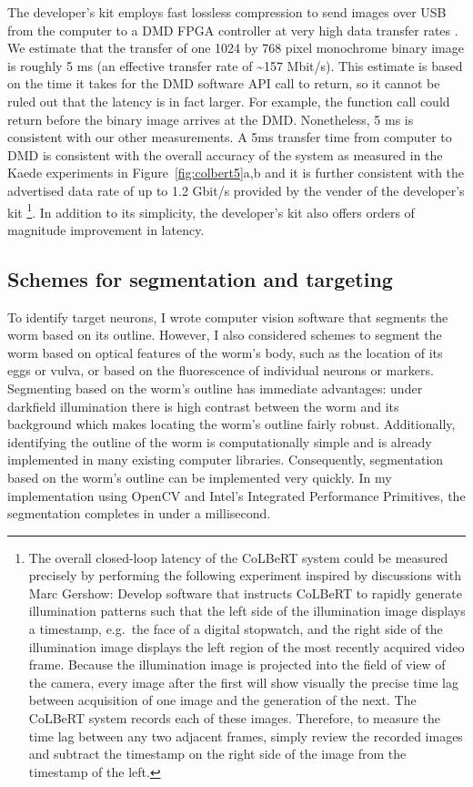 The developer's kit employs fast lossless compression to send images over USB from the computer to a DMD FPGA controller at very high data transfer rates 
\citep{vialux_vialux_2009}. We estimate that the transfer of one 1024 by 768 pixel monochrome binary image is roughly 5 ms (an effective transfer rate of \textasciitilde157 Mbit/s). This estimate is based on the time it takes for the DMD software API call to return, so it cannot be ruled out that the latency is in fact larger. For example, the function call could return before the binary image arrives at the DMD. Nonetheless, 5 ms is consistent with our other measurements. A 5ms transfer time from computer to DMD is consistent with the overall accuracy of the system as measured in the Kaede experiments in Figure~\ref{fig:colbert5}a,b and it is further consistent with the advertised data rate of up to 1.2 Gbit/s provided by the vender of the developer's kit \citep{vialux_vialux_2009}\footnote{The overall closed-loop latency of the CoLBeRT system could be measured precisely by performing the following experiment inspired by discussions with Marc Gershow: Develop software that instructs CoLBeRT to rapidly generate illumination patterns such that the left side of the illumination image displays a timestamp, e.g.~the face of a digital stopwatch, and the right side of the illumination image displays the left region of the most recently acquired video frame. Because the illumination image is projected into the field of view of the camera, every image after the first will show visually  the precise time lag between acquisition of one image and the generation of the next. The CoLBeRT system records each of these images. Therefore, to measure the time lag between any two adjacent frames, simply review the recorded images and subtract the timestamp on the right side of the image from the timestamp of the left.}. In addition to its simplicity, the developer's kit also offers orders of magnitude improvement in latency. 

\subsection{Schemes for segmentation and targeting}
To identify target neurons, I wrote computer vision software that segments the worm based on its outline. However, I also considered schemes to segment the worm based on optical features of the worm's body, such as the location of its eggs or vulva,  or based on the fluorescence of individual neurons or markers. Segmenting based on the worm's outline has immediate advantages: under darkfield illumination there is high contrast between the worm and its background which makes locating the worm's outline fairly robust. Additionally, identifying the outline of the worm is computationally simple and is already implemented in many existing computer libraries. Consequently, segmentation based on the worm's outline can be implemented very quickly. In my implementation using OpenCV and Intel's Integrated Performance Primitives, the segmentation completes in under a millisecond.

